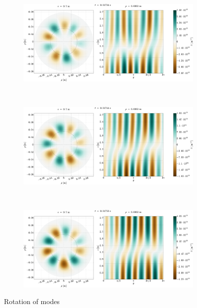 \begin{figure}[htbp]
    \centering
    \begin{subfigure}[h]{1.00\textwidth}
        \centering
        \includegraphics[width=1.0\textwidth]{fig/results/rotModes/n-perpPol-2D-fluct-0}
        \label{fig:rot1}
    \end{subfigure}%
    \\
    \begin{subfigure}[h]{1.00\textwidth}
        \centering
        \includegraphics[width=1.0\textwidth]{fig/results/rotModes/n-perpPol-2D-fluct-1}
        \label{fig:rot2}
    \end{subfigure}
    \\
    \begin{subfigure}[h]{1.00\textwidth}
        \centering
        \includegraphics[width=1.0\textwidth]{fig/results/rotModes/n-perpPol-2D-fluct-2}
        \label{fig:rot3}
    \end{subfigure}
    \caption{Rotation of modes}
    \label{fig:modeRotation}
\end{figure}

